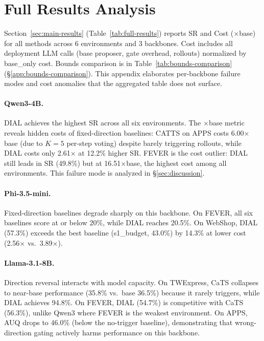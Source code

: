 \section{Full Results Analysis}
\label{app:full-results}

Section~\ref{sec:main-results} (Table~\ref{tab:full-results})
reports SR and Cost ($\times$base) for all methods across 6
environments and 3 backbones. Cost includes all deployment LLM
calls (base proposer, gate overhead, rollouts) normalized by
base\_only cost. Bounds comparison is in
Table~\ref{tab:bounds-comparison} (\S\ref{app:bounds-comparison}).
This appendix elaborates per-backbone failure modes and cost
anomalies that the aggregated table does not surface.

\paragraph{Qwen3-4B.} DIAL achieves the highest SR across all
six environments. The $\times$base metric reveals hidden costs
of fixed-direction baselines: CATTS on APPS costs
6.00$\times$base (due to $K{=}5$ per-step voting) despite
barely triggering rollouts, while DIAL costs only
2.61$\times$ at 12.2\% higher SR. FEVER is the cost outlier:
DIAL still leads in SR (49.8\%) but at 16.51$\times$base, the
highest cost among all environments. This failure mode is
analyzed in \S\ref{sec:discussion}.

\paragraph{Phi-3.5-mini.} Fixed-direction baselines degrade
sharply on this backbone. On FEVER, all six baselines score at or
below 20\%, while DIAL reaches 20.5\%. On WebShop,
DIAL (57.3\%) exceeds the best baseline (s1\_budget, 43.0\%) by
14.3\% at lower cost (2.56$\times$ vs.\ 3.89$\times$).

\paragraph{Llama-3.1-8B.} Direction reversal interacts with model
capacity. On TWExpress, CaTS collapses to near-base performance
(35.8\% vs.\ base 36.5\%) because it rarely triggers, while DIAL
achieves 94.8\%. On FEVER, DIAL (54.7\%) is competitive with CaTS
(56.3\%), unlike Qwen3 where FEVER is the weakest environment.
On APPS, AUQ drops to
46.0\% (below the no-trigger baseline), demonstrating that wrong-direction
gating actively harms performance on this backbone.


